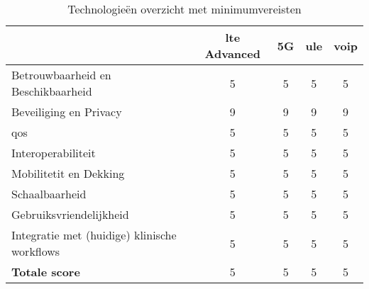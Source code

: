 \begin{table}[h!]
    \begin{center}
    \caption{Technologieën overzicht met minimumvereisten}
    \label{tab:Vergelijken van technologieën}
    \begin{tabular}{|l|c|c|c|c|}
    & \textbf{\gls{lte} Advanced} & \textbf{5G} & \textbf{\gls{ule}} & \textbf{\gls{voip}}\\
    \hline
    Betrouwbaarheid en Beschikbaarheid & 5 & 5 & 5 & 5\\
    Beveiliging en Privacy & 9 & 9 & 9 & 9 \\
    \acrfull{qos} & 5 & 5 & 5 & 5\\
    Interoperabiliteit & 5 & 5 & 5 & 5\\
    Mobilitetit en Dekking & 5 & 5 & 5 & 5\\
    Schaalbaarheid & 5 & 5 & 5 & 5\\
    Gebruiksvriendelijkheid & 5 & 5 & 5 & 5\\
    Integratie met (huidige) klinische workflows  & 5 & 5 & 5 & 5\\
    \hline
    \textbf{Totale score}  & 5 & 5 & 5 & 5\\
    \end{tabular}
    \end{center}
    \end{table}
